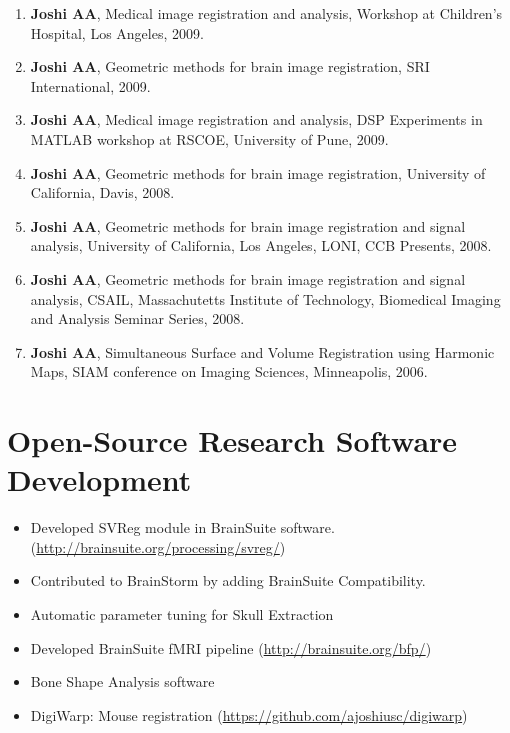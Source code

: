 \documentclass[overlapped,line,letterpaper]{res}
\begin{document}
\begin{resume}
\begin{enumerate}
    \item \textbf{Joshi AA}, Medical image registration and analysis, Workshop at Children's Hospital, Los Angeles, 2009.

    \item \textbf{Joshi AA}, Geometric methods for brain image registration, SRI International, 2009. 

    \item \textbf{Joshi AA}, Medical image registration and analysis, DSP Experiments in MATLAB workshop at RSCOE, University of Pune, 2009.

    \item \textbf{Joshi AA}, Geometric methods for brain image registration, University of California, Davis, 2008.

    \item \textbf{Joshi AA}, Geometric methods for brain image registration and signal analysis, University of California, Los Angeles, LONI, CCB Presents, 2008.

    \item \textbf{Joshi AA}, Geometric methods for brain image registration and signal analysis, CSAIL, Massachutetts Institute of Technology, Biomedical Imaging and Analysis Seminar Series, 2008.

    \item \textbf{Joshi AA}, Simultaneous Surface and Volume Registration using Harmonic Maps, SIAM conference on Imaging Sciences, Minneapolis, 2006.
\end{enumerate}

\section{Open-Source Research Software Development}
\begin{itemize}
    \item Developed SVReg module in BrainSuite software. (\url{http://brainsuite.org/processing/svreg/})
    \item Contributed to BrainStorm by adding BrainSuite Compatibility.
    \item Automatic parameter tuning for Skull Extraction 
    \item Developed BrainSuite fMRI pipeline (\url{http://brainsuite.org/bfp/})
    \item Bone Shape Analysis software
    \item DigiWarp: Mouse registration (\url{https://github.com/ajoshiusc/digiwarp})
\end{itemize}


\end{resume}
\end{document}
